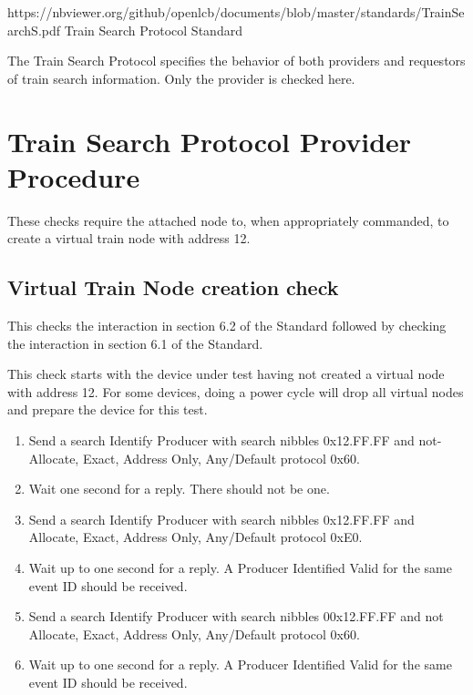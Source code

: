 



\maketitle
\thispagestyle{firststyle}

\introductionCaveats
    {https://nbviewer.org/github/openlcb/documents/blob/master/standards/TrainSearchS.pdf}
    {Train Search Protocol Standard}

The Train Search Protocol specifies the behavior of both providers and requestors of 
train search information.  Only the provider is checked here.


\section{Train Search Protocol Provider Procedure}


These checks require the attached node to, when appropriately commanded,
to create a virtual train node with address 12.

\subsection{Virtual Train Node creation check}

This checks the interaction in section 6.2 of the Standard
followed by checking the interaction in section 6.1 of the Standard.

This check starts with the device under test having not created a
virtual node with address 12. For some devices, doing a power cycle will 
drop all virtual nodes and prepare the device for this test.

\begin{enumerate}

\item Send a search Identify Producer with search nibbles 0x12.FF.FF and 
    not-Allocate, Exact, Address Only, Any/Default protocol 0x60.
    
\item Wait one second for a reply.  There should not be one.

\item Send a search Identify Producer with search nibbles 0x12.FF.FF and 
    Allocate, Exact, Address Only, Any/Default protocol 0xE0.

\item Wait up to one second for a reply.  A Producer Identified Valid for the same event ID
    should be received.

\item Send a search Identify Producer with search nibbles 00x12.FF.FF and 
    not Allocate, Exact, Address Only, Any/Default protocol 0x60.

\item Wait up to one second for a reply.  A Producer Identified Valid for the same event ID
    should be received.    

\end{enumerate}

